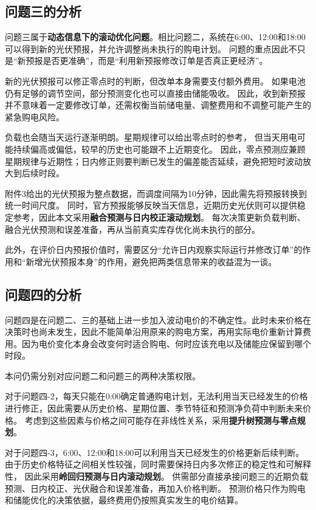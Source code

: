 \subsection{问题三的分析}
问题三属于\textbf{动态信息下的滚动优化问题}。相比问题二，系统在6:00、12:00和18:00可以得到新的光伏预报，并允许调整尚未执行的购电计划。
问题的重点因此不只是“新预报是否更准确”，而是“利用新预报修改订单是否真正更经济”。

新的光伏预报可以修正零点时的判断，但改单本身需要支付额外费用。
如果电池仍有足够的调节空间，部分预测变化也可以直接由储能吸收。
因此，收到新预报并不意味着一定要修改订单，还需权衡当前储电量、调整费用和不调整可能产生的紧急购电风险。

负载也会随当天运行逐渐明朗。星期规律可以给出零点时的参考，
但当天用电可能持续偏高或偏低，较早的历史也可能跟不上近期变化。
因此，零点预测应兼顾星期规律与近期性；日内修正则要判断已发生的偏差能否延续，避免把短时波动放大到后续时段。

附件3给出的光伏预报为整点数据，而调度间隔为10分钟，因此需先将预报转换到统一时间尺度。
同时，官方预报能够反映当天信息，近期历史光伏则可以提供稳定参考，因此本文采用\textbf{融合预测与日内校正滚动规划}。
每次决策更新负载判断、融合光伏预测和误差准备，再从当前真实库存优化尚未执行的部分。

此外，在评价日内预报价值时，需要区分“允许日内观察实际运行并修改订单”的作用和“新增光伏预报本身”的作用，避免把两类信息带来的收益混为一谈。

\subsection{问题四的分析}

问题四是在问题二、三的基础上进一步加入波动电价的不确定性。此时未来价格在决策时也尚未发生，因此不能简单沿用原来的购电方案，再用实际电价重新计算费用。因为电价变化本身会改变何时适合购电、何时应该充电以及储能应保留到哪个时段。

本问仍需分别对应问题二和问题三的两种决策权限。

对于问题四-2，每天只能在0:00确定普通购电计划，无法利用当天已经发生的价格进行修正，因此需要从历史价格、星期位置、季节特征和预测净负荷中判断未来价格。
考虑到这些因素与价格之间可能存在非线性关系，采用\textbf{提升树预测与零点规划}。

对于问题四-3，6:00、12:00和18:00可以利用当天已经发生的价格更新后续判断。
由于历史价格特征之间相关性较强，同时需要保持日内多次修正的稳定性和可解释性，
因此采用\textbf{岭回归预测与日内滚动规划}。
供需部分直接承接问题三的近期负载预测、日内校正、光伏融合和误差准备，再加入价格判断。
预测价格只作为购电和储能优化的决策依据，最终费用仍按照真实发生的电价结算。
